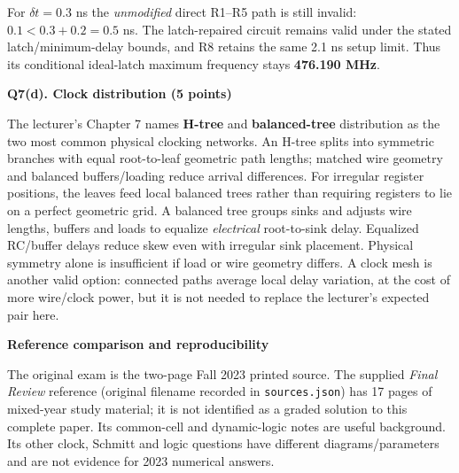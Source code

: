 \documentclass[10pt]{article}
\newcommand{\qheading}[1]{\par\medskip\textbf{#1}\par}
\begin{document}
For $\delta t=0.3$ ns the \emph{unmodified} direct R1--R5 path is still invalid: $0.1<0.3+0.2=0.5$ ns. The latch-repaired circuit remains valid under the stated latch/minimum-delay bounds, and R8 retains the same 2.1 ns setup limit. Thus its conditional ideal-latch maximum frequency stays \textbf{476.190 MHz}.
\newpage
\qheading{Q7(d). Clock distribution (5 points)}
The lecturer's Chapter 7 names \textbf{H-tree} and \textbf{balanced-tree} distribution as the two most common physical clocking networks.
An H-tree splits into symmetric branches with equal root-to-leaf geometric path lengths; matched wire geometry and balanced buffers/loading reduce arrival differences. For irregular register positions, the leaves feed local balanced trees rather than requiring registers to lie on a perfect geometric grid.
A balanced tree groups sinks and adjusts wire lengths, buffers and loads to equalize \emph{electrical} root-to-sink delay. Equalized RC/buffer delays reduce skew even with irregular sink placement. Physical symmetry alone is insufficient if load or wire geometry differs. A clock mesh is another valid option: connected paths average local delay variation, at the cost of more wire/clock power, but it is not needed to replace the lecturer's expected pair here.
\begin{center}\end{center}
\qheading{Reference comparison and reproducibility}
The original exam is the two-page Fall 2023 printed source. The supplied \emph{Final Review} reference (original filename recorded in \texttt{sources.json}) has 17 pages of mixed-year study material; it is not identified as a graded solution to this complete paper. Its common-cell and dynamic-logic notes are useful background. Its other clock, Schmitt and logic questions have different diagrams/parameters and are not evidence for 2023 numerical answers.
\end{document}
